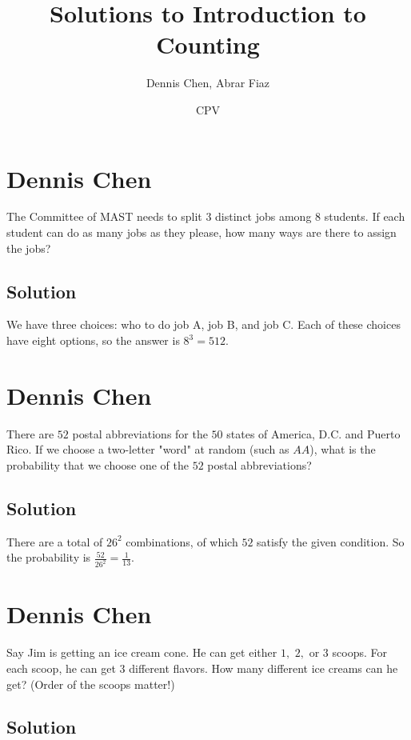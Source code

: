 \documentclass[mast]{lucky}
\title{Solutions to Introduction to Counting}
\author{Dennis Chen, Abrar Fiaz}
\date{CPV}
\begin{document}
\maketitle

\toc

\pagebreak\section{Dennis Chen}

The Committee of MAST needs to split $3$ distinct jobs among $8$ students. If each student can do as many jobs as they please, how many ways are there to assign the jobs?

\subsection{Solution}
We have three choices: who to do job A, job B, and job C. Each of these choices have eight options, so the answer is $8^3=512.$

\pagebreak\section{Dennis Chen}

There are $52$ postal abbreviations for the $50$ states of America, D.C. and Puerto Rico. If we choose a two-letter "word" at random (such as $AA$), what is the probability that we choose one of the $52$ postal abbreviations?
\subsection{Solution}

There are a total of $26^2$ combinations, of which $52$ satisfy the given condition. So the probability is $\frac{52}{26^2}=\frac{1}{13}.$

\pagebreak\section{Dennis Chen}

Say Jim is getting an ice cream cone. He can get either $1,$ $2,$ or $3$ scoops. For each scoop, he can get $3$ different flavors. How many different ice creams can he get? (Order of the scoops matter!)

\subsection{Solution}
\end{document}
